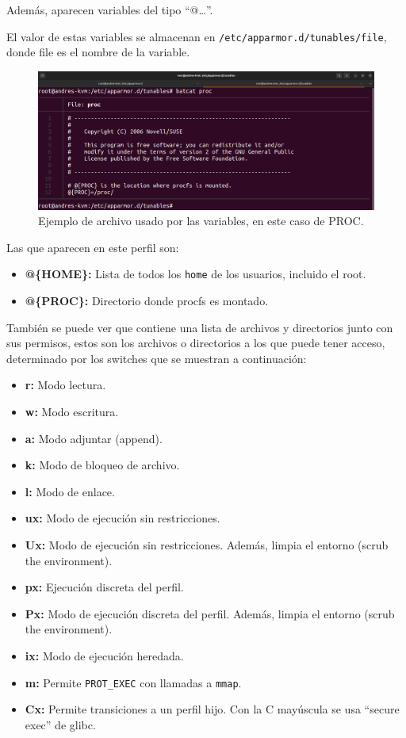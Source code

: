 \documentclass{article}
\begin{document}
Además, aparecen variables del tipo ``@{\dots}''.

El valor de estas variables se almacenan en \verb|/etc/apparmor.d/tunables/file|, donde file es el nombre de la variable.

\begin{figure}[H]
    \includegraphics[width=\textwidth]{imagenes/Captura desde 2022-10-18 16-25-52.png}
    \caption{Ejemplo de archivo usado por las variables, en este caso de PROC.}
\end{figure}

\bigskip

Las que aparecen en este perfil son:

\begin{itemize}
    \item \textbf{@\{HOME\}: }Lista de todos los \verb|home| de los usuarios, incluido el root.
    \item \textbf{@\{PROC\}: }Directorio donde procfs es montado.
\end{itemize}

\newpage

También se puede ver que contiene una lista de archivos y directorios junto con sus permisos, estos son los archivos o directorios a los que puede tener acceso, determinado por los switches que se muestran a continuación:

\begin{itemize}
    \item \textbf{r: }Modo lectura.
    \item \textbf{w: }Modo escritura.
    \item \textbf{a: }Modo adjuntar (append).
    \item \textbf{k: }Modo de bloqueo de archivo.
    \item \textbf{l: }Modo de enlace.
    \item \textbf{ux: }Modo de ejecución sin restricciones.
    \item \textbf{Ux: }Modo de ejecución sin restricciones. Además, limpia el entorno (scrub the environment).
    \item \textbf{px: }Ejecución discreta del perfil.
    \item \textbf{Px: }Modo de ejecución discreta del perfil. Además, limpia el entorno (scrub the environment).
    \item \textbf{ix: }Modo de ejecución heredada.
    \item \textbf{m: }Permite \verb|PROT_EXEC| con llamadas a \verb|mmap|.
    \item \textbf{Cx: }Permite transiciones a un perfil hijo. Con la C mayúscula se usa ``secure exec'' de glibc.
\end{itemize}
\end{document}
